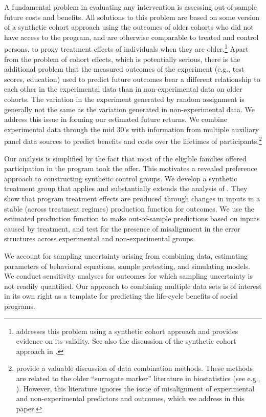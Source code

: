 A fundamental problem in evaluating any intervention is assessing out-of-sample future costs and benefits. All solutions to this problem are based on some version of a synthetic cohort approach using the outcomes of older cohorts who did not have access to the program, and are otherwise comparable to treated and control persons, to proxy treatment effects of individuals when they are older.\footnote{\cite{Mincer_1974_schooling} addresses this problem using a synthetic cohort approach and provides evidence on its validity. See also the discussion of the synthetic cohort approach in \cite{Heckman_Lochner_ea_2006_HEE}.} Apart from the problem of cohort effects, which is potentially serious, there is the additional problem that the measured outcomes of the experiment (e.g., test scores, education) used to predict future outcomes bear a different relationship to each other in the experimental data than in non-experimental data on older cohorts. The variation in the experiment generated by random assignment is generally not the same as the variation generated in non-experimental data. We address this issue in forming our estimated future returns. We combine experimental data through the mid 30's with information from multiple auxiliary panel data sources to predict benefits and costs over the lifetimes of participants.\footnote{\citet{Ridder_Moffitt_2007_hbk_metricsdata} provide a valuable discussion of data combination methods. These methods are related to the older ``surrogate marker'' literature in biostatistics (see e.g., \citealp{Prentice_1989_Surrogate_SiM}). However, this literature ignores the issue of misalignment of experimental and non-experimental predictors and outcomes, which we address in this paper.}

Our analysis is simplified by the fact that most of the eligible families offered participation in the program took the offer. This motivates a revealed preference approach to constructing synthetic control groups. We develop a synthetic treatment group that applies and substantially extends the analysis of \citet{Heckman_Pinto_etal_2013_PerryFactor}. They show that program treatment effects are produced through changes in inputs in a stable (across treatment regimes) production function for outcomes. We use the estimated production function to make out-of-sample predictions based on inputs caused by treatment, and test for the presence of misalignment in the error structures across experimental and non-experimental groups.

We account for sampling uncertainty arising from combining data, estimating parameters of behavioral equations, sample pretesting, and simulating models. We conduct sensitivity analyses for outcomes for which sampling uncertainty is not readily quantified. Our approach to combining multiple data sets is of interest in its own right as a template for predicting the life-cycle benefits of social programs.

